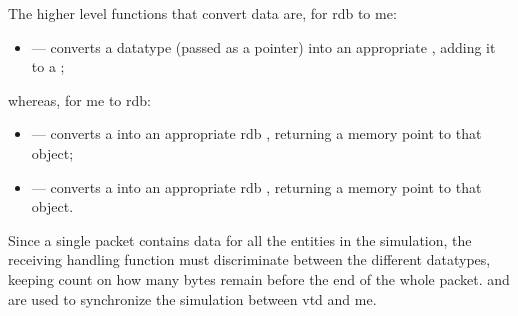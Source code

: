 The higher level functions that convert data are, for \gls{rdb} to \gls{me}:

\begin{itemize}
	\item {} --- converts a datatype (passed as a pointer) into an appropriate , adding it to a ;
\end{itemize}

\FLOATnoindent whereas, for \gls{me} to \gls{rdb}:

\begin{itemize}
	\item {} --- converts a  into an appropriate \gls{rdb} , returning a memory point to that object;
	\item {} --- converts a  into an appropriate \gls{rdb} , returning a memory point to that object.
\end{itemize}

Since a single  \gls{packet} contains data for all the entities in the simulation, the receiving handling function must discriminate between the different datatypes, keeping count on how many bytes remain before the end of the whole \gls{packet}.  and  are used to synchronize the simulation between \gls{vtd} and \gls{me}.

